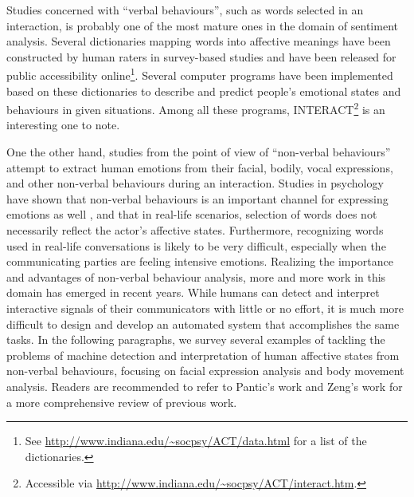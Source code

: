 Studies concerned with ``verbal behaviours'', such as words selected in an interaction, is probably one of the most mature ones in the domain of sentiment analysis. Several dictionaries mapping words into affective meanings have been constructed by human raters in survey-based studies and have been released for public accessibility online\footnote{See \url{http://www.indiana.edu/~socpsy/ACT/data.html} for a list of the dictionaries.}. Several computer programs have been implemented based on these dictionaries to describe and predict people's emotional states and behaviours in given situations. Among all these programs, INTERACT\footnote{Accessible via \url{http://www.indiana.edu/~socpsy/ACT/interact.htm}.} is an interesting one to note.

One the other hand, studies from the point of view of ``non-verbal behaviours'' attempt to extract human emotions from their facial, bodily, vocal expressions, and other non-verbal behaviours during an interaction. Studies in psychology have shown that non-verbal behaviours is an important channel for expressing emotions as well \cite{schroder2013culture}, and that in real-life scenarios, selection of words does not necessarily reflect the actor's affective states. Furthermore, recognizing words used in real-life conversations is likely to be very difficult, especially when the communicating parties are feeling intensive emotions. Realizing the importance and advantages of non-verbal behaviour analysis, more and more work in this domain has emerged in recent years. While humans can detect and interpret interactive signals of their communicators with little or no effort, it is much more difficult to design and develop an automated system that accomplishes the same tasks. In the following paragraphs, we survey several examples of tackling the problems of machine detection and interpretation of human affective states from non-verbal behaviours, focusing on facial expression analysis and body movement analysis. Readers are recommended to refer to Pantic's work \cite{pantic2003toward} and Zeng's work \cite{zeng2009survey} for a more comprehensive review of previous work.

